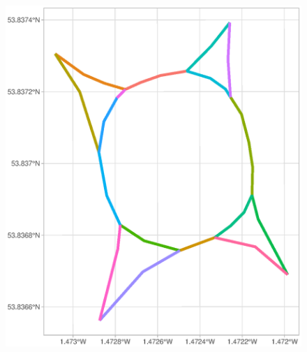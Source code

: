\documentclass[c,10pt,pdftex]{beamer}
\begin{document}
\begin{frame}
\begin{columns}
\begin{column}{0.5\linewidth}
\begin{figure}
      \includegraphics[width = 0.9\linewidth, trim = {0 0 0 4cm}, clip]{images/roundabout2}
      \end{figure}
    \end{column}
  \end{columns}
\end{frame}
\end{document}
